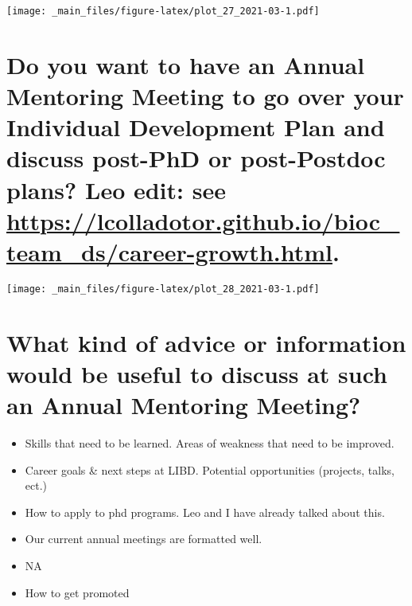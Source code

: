 \documentclass[
]{book}
\providecommand{\tightlist}{%
  \setlength{\itemsep}{0pt}\setlength{\parskip}{0pt}}
\begin{document}
\texttt{[image: \_main\_files/figure-latex/plot\_27\_2021-03-1.pdf]}

\hypertarget{do-you-want-to-have-an-annual-mentoring-meeting-to-go-over-your-individual-development-plan-and-discuss-post-phd-or-post-postdoc-plans-leo-edit-see-httpslcolladotor.github.iobioc_team_dscareer-growth.html.-1}{%
\section{\texorpdfstring{Do you want to have an Annual Mentoring Meeting to go over your Individual Development Plan and discuss post-PhD or post-Postdoc plans? Leo edit: see \url{https://lcolladotor.github.io/bioc_team_ds/career-growth.html}.}{Do you want to have an Annual Mentoring Meeting to go over your Individual Development Plan and discuss post-PhD or post-Postdoc plans? Leo edit: see https://lcolladotor.github.io/bioc\_team\_ds/career-growth.html.}}\label{do-you-want-to-have-an-annual-mentoring-meeting-to-go-over-your-individual-development-plan-and-discuss-post-phd-or-post-postdoc-plans-leo-edit-see-httpslcolladotor.github.iobioc_team_dscareer-growth.html.-1}}

\texttt{[image: \_main\_files/figure-latex/plot\_28\_2021-03-1.pdf]}

\hypertarget{what-kind-of-advice-or-information-would-be-useful-to-discuss-at-such-an-annual-mentoring-meeting-1}{%
\section{What kind of advice or information would be useful to discuss at such an Annual Mentoring Meeting?}\label{what-kind-of-advice-or-information-would-be-useful-to-discuss-at-such-an-annual-mentoring-meeting-1}}

\begin{itemize}
\tightlist
\item
  Skills that need to be learned. Areas of weakness that need to be improved.
\item
  Career goals \& next steps at LIBD. Potential opportunities (projects, talks, ect.)
\item
  How to apply to phd programs. Leo and I have already talked about this.
\item
  Our current annual meetings are formatted well.
\item
  NA
\item
  How to get promoted
\end{itemize}
\end{document}
